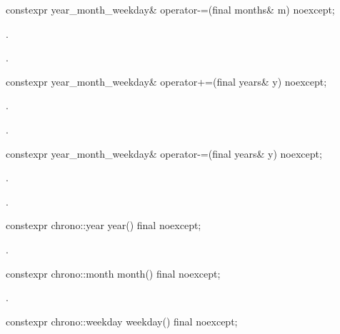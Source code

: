 %
\begin{itemdecl}
constexpr year_month_weekday& operator-=(final months& m) noexcept;
\end{itemdecl}

\begin{itemdescr}
\pnum
\effects {}.

\pnum
\returns {}.
\end{itemdescr}

%
\begin{itemdecl}
constexpr year_month_weekday& operator+=(final years& y) noexcept;
\end{itemdecl}

\begin{itemdescr}
\pnum
\effects {}.

\pnum
\returns {}.
\end{itemdescr}

%
\begin{itemdecl}
constexpr year_month_weekday& operator-=(final years& y) noexcept;
\end{itemdecl}

\begin{itemdescr}
\pnum
\effects {}.

\pnum
\returns {}.
\end{itemdescr}

%
\begin{itemdecl}
constexpr chrono::year year() final noexcept;
\end{itemdecl}

\begin{itemdescr}
\pnum
\returns {}.
\end{itemdescr}

%
\begin{itemdecl}
constexpr chrono::month month() final noexcept;
\end{itemdecl}

\begin{itemdescr}
\pnum
\returns {}.
\end{itemdescr}

%
\begin{itemdecl}
constexpr chrono::weekday weekday() final noexcept;
\end{itemdecl}

